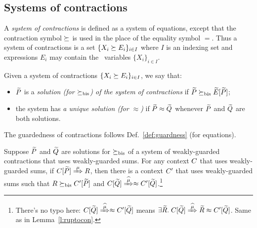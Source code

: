 \subsection{Systems of contractions}
\label{ss:SysContr}

A \emph{system of contractions} is defined as a system of equations,
except that the contraction symbol $\mathrel{\succeq}$ is used in the place of
the equality symbol $=$. Thus a system of contractions is a set 
$\{  X_i \mathrel{\succeq} E_i\}_{i\in I}$
where $I$ is an  indexing set and expressions
$E_i$  may contain the  \behavC\  variables 
$\{  X_i\}_{i\in I}$.

\begin{definition}
\label{d:uniContra}
Given a system of contractions 
$\{  X_i \mathrel{\succeq} E_i\}_{i\in I}$, 
 we say that:
\begin{itemize}
\item $\widetilde P$ is a \emph{solution (for $\mathrel{\succeq_{\rm{bis}}}$) of the 
 system of contractions} if $\widetilde P \mathrel{\succeq_{\rm{bis}}} \widetilde E [\widetilde P]$;
\item the system has \emph{a unique solution (for $\approx$)}
if $\widetilde P \approx \widetilde Q$ whenever $\widetilde P$ and $\widetilde Q$ are both solutions.
\end{itemize}
\end{definition}

The guardedness of contractions follows Def.~\ref{def:guardness} (for equations).


\begin{lemma}
\label{l:uptocon}
Suppose $\widetilde P$ and $\widetilde Q$ are solutions  for $\mathrel{\succeq_{\rm{bis}}}$
 of a system of weakly-guarded contractions that uses 
weakly-guarded sums.
For any context $C$  that uses 
weakly-guarded sums,
if  $\ct{\til P}\Arr{\mu}  R$,
 then 
there is a context $C'$  that uses 
weakly-guarded sums
such that $R \mathrel{\succeq_{\rm{bis}}} C' [\widetilde P]$ and $\ct{\til Q} \Arcap{\mu}
 \wb \ctp{\til Q}$.\footnote{There's no typo here: $\ct{\til Q} \Arcap{\mu} \wb \ctp{\til
     Q}$ means $\exists {\til R}.\; \ct{\til Q} \Arcap{\mu} {\til R}
   \wb \ctp{\til Q}$. Same as in Lemma~\ref{l:ruptocon}.}
\end{lemma}


